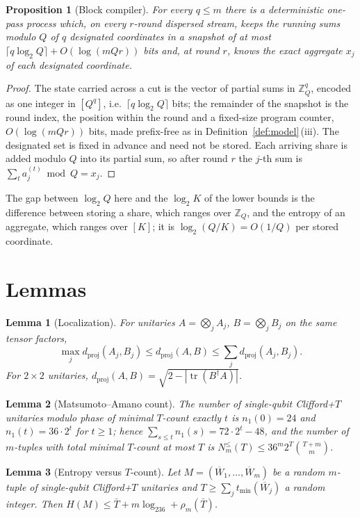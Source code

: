 \documentclass[aps,prx,twocolumn,superscriptaddress,nofootinbib,longbibliography]{revtex4-2}
\theoremstyle{plain}
\newtheorem{lemma}{Lemma}
\newtheorem{proposition}{Proposition}
\theoremstyle{definition}
\theoremstyle{remark}
\newcommand{\dproj}{d_{\mathrm{proj}}}
\newcommand{\Z}{\mathbb{Z}}
\newcommand{\tr}{\operatorname{tr}}
\begin{document}
\begin{proposition}[Block compiler]\label{prop:block}
For every $q\le m$ there is a deterministic one-pass process which, on every $r$-round dispersed stream, keeps the running sums modulo $Q$ of $q$ designated coordinates in a snapshot of at most $\lceil q\log_2Q\rceil+O(\log(mQr))$ bits and, at round $r$, knows the exact aggregate $x_j$ of each designated coordinate.
\end{proposition}
\begin{proof}
The state carried across a cut is the vector of partial sums in $\Z_Q^q$, encoded as one integer in $[Q^q]$, i.e.\ $\lceil q\log_2Q\rceil$ bits; the remainder of the snapshot is the round index, the position within the round and a fixed-size program counter, $O(\log(mQr))$ bits, made prefix-free as in Definition~\ref{def:model}\,(iii). The designated set is fixed in advance and need not be stored. Each arriving share is added modulo $Q$ into its partial sum, so after round $r$ the $j$-th sum is $\sum_ta^{(t)}_j\bmod Q=x_j$.
\end{proof}
The gap between $\log_2Q$ here and the $\log_2K$ of the lower bounds is the difference between storing a share, which ranges over $\Z_Q$, and the entropy of an aggregate, which ranges over $[K]$; it is $\log_2(Q/K)=O(1/Q)$ per stored coordinate.

\section{Lemmas}\label{app:lemmas}


\begin{lemma}[Localization]\label{lem:loc}
For unitaries $A=\bigotimes_jA_j$, $B=\bigotimes_jB_j$ on the same tensor factors,
\[\max_j\dproj(A_j,B_j)\le\dproj(A,B)\le\sum_j\dproj(A_j,B_j).\]
For $2\times2$ unitaries, $\dproj(A,B)=\sqrt{2-|\tr(B^\dagger A)|}$.
\end{lemma}

\begin{lemma}[Matsumoto--Amano count]\label{lem:MA}
The number of single-qubit Clifford+$T$ unitaries modulo phase of minimal $T$-count exactly $t$ is $n_1(0)=24$ and $n_1(t)=36\cdot2^t$ for $t\ge1$; hence $\sum_{s\le t}n_1(s)=72\cdot2^t-48$, and the number of $m$-tuples with total minimal $T$-count at most $T$ is $N^{\le}_m(T)\le36^m2^T\binom{T+m}{m}$.
\end{lemma}

\begin{lemma}[Entropy versus $T$-count]\label{lem:ent}
Let $M=(\overline W_1,\allowbreak\dots,\allowbreak\overline W_m)$ be a random $m$-tuple of single-qubit Clifford+$T$ unitaries and $T\ge\sum_jt_{\min}(\overline W_j)$ a random integer. Then $H(M)\le\bar T+m\log_236+\rho_m(\bar T)$.
\end{lemma}
\end{document}
